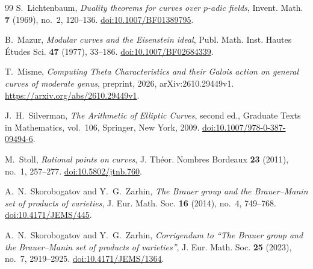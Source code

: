 \begin{thebibliography}{99}
S.~Lichtenbaum,
\emph{Duality theorems for curves over $p$-adic fields},
Invent. Math. \textbf{7} (1969), no.~2, 120--136.
\href{https://doi.org/10.1007/BF01389795}{doi:10.1007/BF01389795}.

B.~Mazur,
\emph{Modular curves and the Eisenstein ideal},
Publ. Math. Inst. Hautes \'Etudes Sci. \textbf{47} (1977), 33--186.
\href{https://doi.org/10.1007/BF02684339}{doi:10.1007/BF02684339}.

T.~Misme,
\emph{Computing Theta Characteristics and their Galois action on general curves of moderate genus},
preprint, 2026, arXiv:2610.29449v1.
\url{https://arxiv.org/abs/2610.29449v1}.

J.~H.~Silverman,
\emph{The Arithmetic of Elliptic Curves}, second ed.,
Graduate Texts in Mathematics, vol.~106,
Springer, New York, 2009.
\href{https://doi.org/10.1007/978-0-387-09494-6}{doi:10.1007/978-0-387-09494-6}.

M.~Stoll,
\emph{Rational points on curves},
J. Th\'eor. Nombres Bordeaux \textbf{23} (2011), no.~1, 257--277.
\href{https://doi.org/10.5802/jtnb.760}{doi:10.5802/jtnb.760}.

A.~N.~Skorobogatov and Y.~G.~Zarhin,
\emph{The Brauer group and the Brauer--Manin set of products of varieties},
J. Eur. Math. Soc. \textbf{16} (2014), no.~4, 749--768.
\href{https://doi.org/10.4171/JEMS/445}{doi:10.4171/JEMS/445}.

A.~N.~Skorobogatov and Y.~G.~Zarhin,
\emph{Corrigendum to ``The Brauer group and the Brauer--Manin set of products of varieties''},
J. Eur. Math. Soc. \textbf{25} (2023), no.~7, 2919--2925.
\href{https://doi.org/10.4171/JEMS/1364}{doi:10.4171/JEMS/1364}.

\end{thebibliography}
